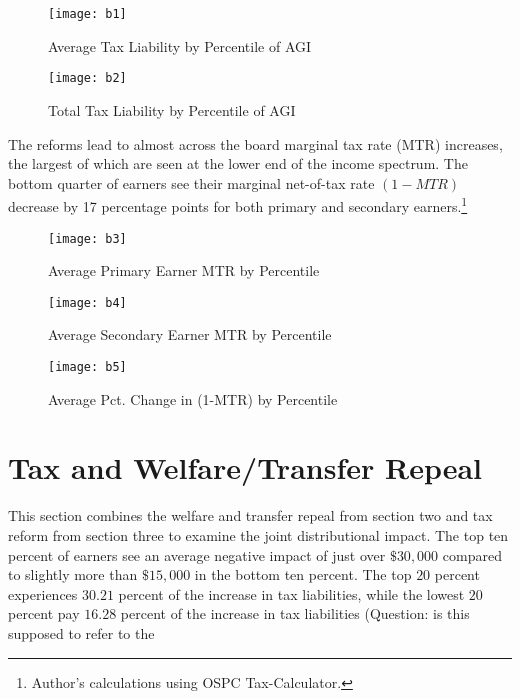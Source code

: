 \documentclass{article}
\begin{document}
\begin{figure}[H]
\centering
\caption{Average Tax Liability by Percentile of AGI}
\texttt{[image: b1]}
\end{figure}

\begin{figure}[H]
\centering
\caption{Total Tax Liability by Percentile of AGI}
\texttt{[image: b2]}
\end{figure}

The reforms lead to almost across the board marginal tax rate (MTR) increases, the largest of which are seen at the lower end of the income spectrum. The bottom quarter of earners see their marginal net-of-tax rate $(1 - MTR)$ decrease by 17 percentage points for both primary and secondary earners.\footnote{Author’s calculations using OSPC Tax-Calculator.}


\begin{figure}[H]
\centering
\caption{Average Primary Earner MTR by Percentile}
\texttt{[image: b3]}
\end{figure}

\begin{figure}[H]
\centering
\caption{Average Secondary Earner MTR by Percentile}
\texttt{[image: b4]}
\end{figure}

\begin{figure}[H]
\centering
\caption{Average Pct. Change in (1-MTR) by Percentile}
\texttt{[image: b5]}
\end{figure}

\section{Tax and Welfare/Transfer Repeal}

This section combines the welfare and transfer repeal from section two and tax reform from section three to examine the joint distributional impact. The top ten percent of earners see an average negative impact of just over $\$30,000$ compared to slightly more than $\$15,000$ in the bottom ten percent. The top $20$ percent experiences $30.21$ percent of the increase in tax liabilities, while the lowest $20$ percent pay $16.28$ percent of the increase in tax liabilities (Question: is this supposed to refer to the %
\end{document}
